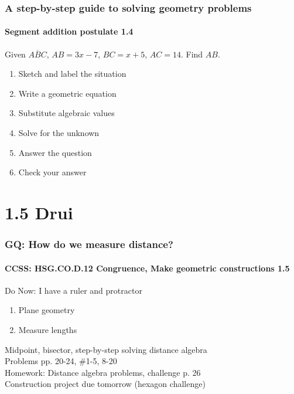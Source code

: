 \documentclass{beamer}
\begin{document}
\frame
{
  \frametitle{A step-by-step guide to solving geometry problems}
  \framesubtitle{Segment addition postulate  \alert{1.4}}
  Given $\overline{ABC}$, $AB=3x-7$, $BC=x+5$, $AC=14$. Find ${AB}$.\\[0.5in]
      \vspace{1cm}
\begin{enumerate}
    \item<2-> Sketch and label the situation\\
    \item<2-> Write a geometric equation\\
    \item<2-> Substitute algebraic values\\
    \item<2-> Solve for the unknown\\
    \item<2-> Answer the question\\
    \item<2-> Check your answer
  \end{enumerate}
}


\section{1.5 Drui}
  \frame
  {
    \frametitle{GQ: How do we measure distance?}
    \framesubtitle{CCSS: HSG.CO.D.12 Congruence, Make geometric constructions  \alert{1.5}}

    \begin{block}{Do Now: I have a ruler and protractor}
    \begin{enumerate}
        \item Plane geometry
        \item Measure lengths
    \end{enumerate}
    \end{block}
    Midpoint, bisector, step-by-step solving distance algebra\\
    Problems pp. 20-24, \#1-5, 8-20\\
    \vspace{0.5cm}
    Homework: Distance algebra problems, challenge p. 26\\
    Construction project due tomorrow (hexagon challenge)
  }
\end{document}

